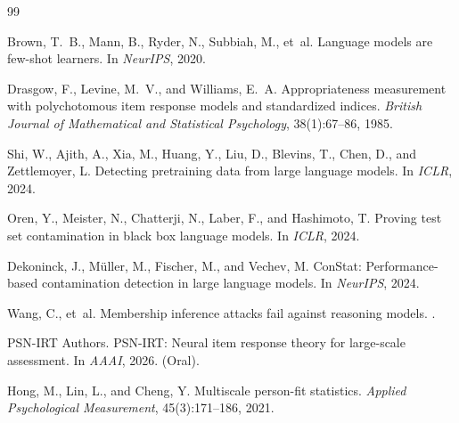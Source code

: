 \documentclass[11pt]{article}
\begin{document}
\begin{thebibliography}{99}

Brown, T.~B., Mann, B., Ryder, N., Subbiah, M., et~al.
\newblock Language models are few-shot learners.
\newblock In \emph{NeurIPS}, 2020.

Drasgow, F., Levine, M.~V., and Williams, E.~A.
\newblock Appropriateness measurement with polychotomous item response models and standardized indices.
\newblock \emph{British Journal of Mathematical and Statistical Psychology}, 38(1):67--86, 1985.

Shi, W., Ajith, A., Xia, M., Huang, Y., Liu, D., Blevins, T., Chen, D., and Zettlemoyer, L.
\newblock Detecting pretraining data from large language models.
\newblock In \emph{ICLR}, 2024.

Oren, Y., Meister, N., Chatterji, N., Laber, F., and Hashimoto, T.
\newblock Proving test set contamination in black box language models.
\newblock In \emph{ICLR}, 2024.

Dekoninck, J., Müller, M., Fischer, M., and Vechev, M.
\newblock ConStat: Performance-based contamination detection in large language models.
\newblock In \emph{NeurIPS}, 2024.

Wang, C., et~al.
\newblock Membership inference attacks fail against reasoning models.
.

{PSN-IRT Authors}.
\newblock PSN-IRT: Neural item response theory for large-scale assessment.
\newblock In \emph{AAAI}, 2026. (Oral).

Hong, M., Lin, L., and Cheng, Y.
\newblock Multiscale person-fit statistics.
\newblock \emph{Applied Psychological Measurement}, 45(3):171--186, 2021.

\end{thebibliography}
\end{document}
